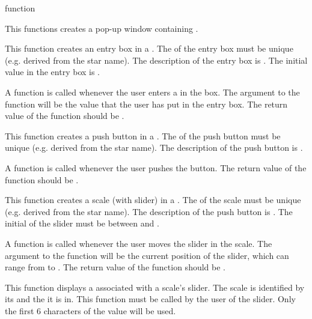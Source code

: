 \begin{sloppypar}
\begin{indexlist}{ function}

This functions creates a pop-up window containing .

This function creates an entry box in a .  The 
of the entry box must be unique (e.g. derived from the star name).  The
description of the entry box is .  The initial value in the
entry box is .

A  function is called whenever the user enters a
 in the box.  The argument to the  function
will be the value that the user has put in the entry box.  The return
value of the  function should be .

This function creates a push button in a .  The 
of the push button must be unique (e.g. derived from the star name).  The
description of the push button is .

A  function is called whenever the user pushes the
button.  The return value of the  function should be
.

This function creates a scale (with slider) in a .  The
 of the scale must be unique (e.g. derived from the star
name).  The description of the push button is .  The initial
 of the slider must be between  and .

A  function is called whenever the user moves the slider
in the scale.  The argument to the  function will be the
current position of the slider, which can range from  to
.  The return value of the  function should be
.

This function displays a  associated with a scale's slider.
The scale is identified by its  and the  it is in.
This function must be called by the user of the slider.
Only the first 6 characters of the value will be used.

\end{indexlist}
\end{sloppypar}
